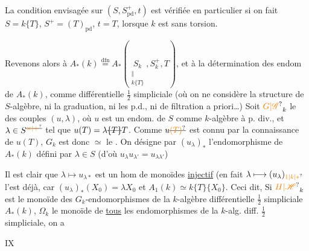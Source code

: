 La condition envisagée sur $(S,S^+_{\mathrm{pd}},t)$ est vérifiée en particulier si on fait $S=k\{T\}$, $S^+=(T)_{\mathrm{pd}}$, $t=T$, lorsque $k$ est sans torsion.

Revenons alors à $\displaystyle A_\ast(k)\overset{\mathrm{dfn}}{=}A_\ast(\underset{\substack{\Vert\\k\{T\}}}{S_k},S_k^+,T)$, et à la détermination des endom de $A_\ast(k)$, comme   différentielle $\frac12$ simpliciale (où on ne considère  la structure de $S$-algèbre, ni la graduation, ni les p.d., ni de filtration a priori\ldots)
 Soit $\unsure{G|\mathscr G}_k$ le   des couples $(u,\lambda)$, où $u$ est un endom. de $S$ comme $k$-algèbre à p. div., et $\lambda\in S^{\deleted{\unsure{\times|+}}}$ tel que $u(T)=\lambda\deleted{\{T\}}T$.
Comme $u\deleted{\unsure{(T)}}$ est connu par la connaissance de $u(T)$,
$G_k$ est donc $\simeq$ le  
 . On désigne par $(u_\lambda)_\ast$ l'endomorphisme de $A_\ast(k)$ défini par $\lambda\in S$ (d'où $u_\lambda u_{\lambda'}=u_{\lambda\lambda'}$)

Il est clair que $\lambda\longmapsto u_{\lambda\ast}$ est un hom de monoïdes \uline{injectif} (en fait $\lambda\longmapsto(u_\lambda)_{\unsure{1|k|\ast}}$ l'est déjà, car $(u_\lambda)_\ast(X_0)=\lambda X_0$ et $A_1(k)\simeq k\{T\}\{X_0\}$. Ceci dit,
Si $\unsure{H|\mathscr H}_k$ est le monoïde des $G_k$-endomorphismes de la $k$-algèbre différentielle $\frac12$ simpliciale $A_\ast(k)$,  $\Omega_k$ le monoïde de \uline{tous} les endomorphismes de la $k$-alg. diff. $\frac12$ simpliciale, on a

\hfill IX

